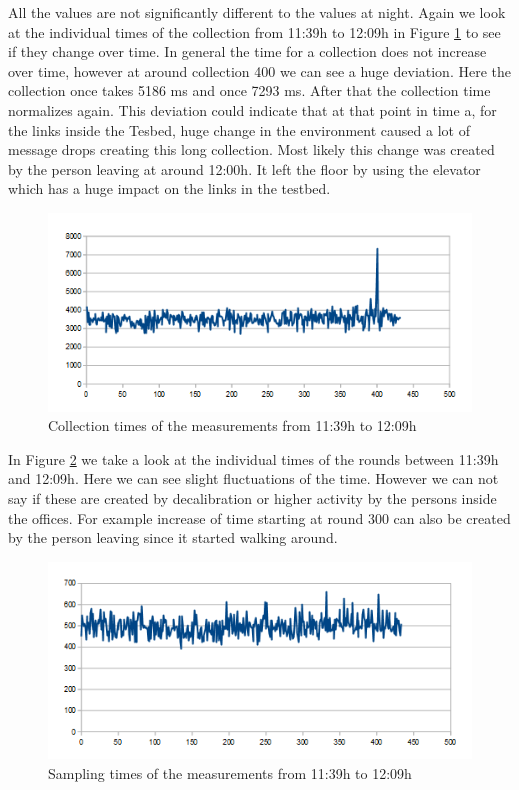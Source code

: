 All the values are not significantly different to the values at night. Again we look at the individual times of the collection from 11:39h to 12:09h in Figure \ref{fig:dayC} to see if they change over time. In general the time for a collection does not increase over time, however at around collection 400 we can see a huge deviation. Here the collection once takes 5186 ms and once 7293 ms. After that the collection time normalizes again. This deviation could indicate that at that point in time a, for the links inside the Tesbed, huge change in the environment caused a lot of message drops creating this long collection. Most likely this change was created by the person leaving at around 12:00h. It left the floor by using the elevator which has a huge impact on the links in the testbed.


\begin{figure}[htbp]
	\centering         
    \includegraphics[scale=0.75]{content/images/Experiment/DayCollection}
    \caption{Collection times of the measurements from 11:39h to 12:09h}
	\label{fig:dayC}
\end{figure}

In Figure \ref{fig:DayR} we take a look at the individual times of the rounds between 11:39h and 12:09h. Here we can see slight fluctuations of the time. However we can not say if these are created by decalibration or higher activity by the persons inside the offices. For example increase of time starting at round 300 can also be created by the person leaving since it started walking around.

\begin{figure}[tbp]
	\centering
    \includegraphics[scale=0.75]{content/images/Experiment/DayRounds}
   	\caption{Sampling times of the measurements from 11:39h to 12:09h}
    \label{fig:DayR}
\end{figure}
    

